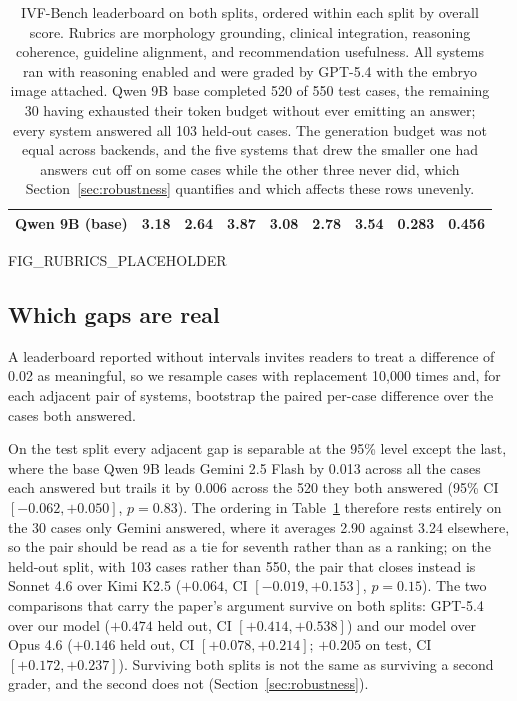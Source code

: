 \begin{table}[H]
\begin{tabular}{lcccccccc}
Qwen 9B (base) & 3.18 & 2.64 & 3.87 & 3.08 & 2.78 & 3.54 & 0.283 & 0.456 \\
\bottomrule
\end{tabular}
\caption{IVF-Bench leaderboard on both splits, ordered within each split by
overall score. Rubrics are morphology grounding, clinical integration, reasoning
coherence, guideline alignment, and recommendation usefulness. All systems ran
with reasoning enabled and were graded by GPT-5.4 with the embryo image
attached. Qwen 9B base completed 520 of 550 test cases, the remaining 30 having
exhausted their token budget without ever emitting an answer;
every system answered all 103 held-out cases. The generation budget was not equal
across backends, and the five systems that drew the smaller one had answers cut
off on some cases while the other three never did, which
Section~\ref{sec:robustness} quantifies and which affects these rows unevenly.}
\label{tab:leaderboard}
\end{table}

FIG_RUBRICS_PLACEHOLDER

\subsection{Which gaps are real}

A leaderboard reported without intervals invites readers to treat a difference
of 0.02 as meaningful, so we resample cases with replacement 10,000 times and, for
each adjacent pair of systems, bootstrap the paired per-case difference over the
cases both answered.

On the test split every adjacent gap is separable at the 95\% level except the
last, where the base Qwen 9B leads Gemini 2.5 Flash by 0.013 across all the cases
each answered but trails it by 0.006 across the 520 they both answered (95\% CI
$[-0.062, +0.050]$, $p{=}0.83$). The ordering in
Table~\ref{tab:leaderboard} therefore rests entirely on the 30 cases only Gemini
answered, where it averages 2.90 against 3.24 elsewhere, so the pair should be
read as a tie for seventh rather than as a ranking; on the held-out split, with 103 cases rather than 550, the pair
that closes instead is Sonnet 4.6 over Kimi K2.5 ($+0.064$, CI $[-0.019,
+0.153]$, $p{=}0.15$). The two comparisons that carry the paper's argument
survive on both splits: GPT-5.4 over our model ($+0.474$ held out, CI $[+0.414,
+0.538]$) and our model over Opus 4.6 ($+0.146$ held out, CI $[+0.078, +0.214]$;
$+0.205$ on test, CI $[+0.172, +0.237]$). Surviving both splits is not the same
as surviving a second grader, and the second does not
(Section~\ref{sec:robustness}).

